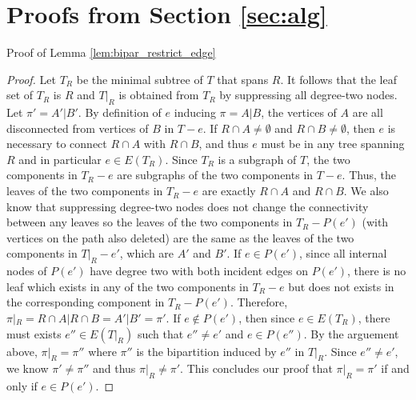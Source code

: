 \documentclass{article}
\begin{document}
\appendix
\section{Proofs from Section \ref{sec:alg}}

Proof of Lemma \ref{lem:bipar_restrict_edge}
\begin{proof}
Let $T_R$ be the minimal subtree of $T$ that spans $R$. It follows that the leaf set of $T_R$ is $R$ and $T|_R$ is obtained from $T_R$ by suppressing all degree-two nodes. Let $\pi' = A'|B'$.
By definition of $e$ inducing $\pi = A|B$, the vertices of $A$ are all disconnected from vertices of $B$ in $T-e$. If $R\cap A \neq \emptyset$ and $R\cap B \neq \emptyset$, then $e$ is necessary to connect $R\cap A$ with $R \cap B$, and thus $e$ must be in any tree spanning $R$ and in particular $e \in E(T_R)$. Since $T_R$ is a subgraph of $T$, the two components in $T_R-e$ are subgraphs of the two components in $T-e$. Thus, the leaves of the two components in $T_R-e$ are exactly $R\cap A$ and $R\cap B$. We also know that suppressing degree-two nodes does not change the connectivity between any leaves so the leaves of the two components in $T_R - P(e')$ (with vertices on the path also deleted) are the same as the leaves of the two components in $T|_R - e'$, which are $A'$ and $B'$. If $e \in P(e')$, since all internal nodes of $P(e')$ have degree two with both incident edges on $P(e')$, there is no leaf which exists in any of the two components in $T_R - e$ but does not exists in the corresponding component in $T_R-P(e')$. Therefore, $\pi|_R = R\cap A|R\cap B = A'|B' = \pi'$. If $e \notin P(e')$, then since $e \in E(T_R)$, there must exists $e'' \in E(T|_R)$ such that $e'' \neq e'$ and $e \in P(e'')$. By the arguement above, $\pi|_R = \pi''$ where $\pi''$ is the bipartition induced by $e''$ in $T|_R$. Since $e'' \neq e'$, we know $\pi' \neq \pi''$ and thus $\pi|_R \neq \pi'$. This concludes our proof that $\pi|_R = \pi'$ if and only if $e \in P(e')$. 
\end{proof}



\end{document}

